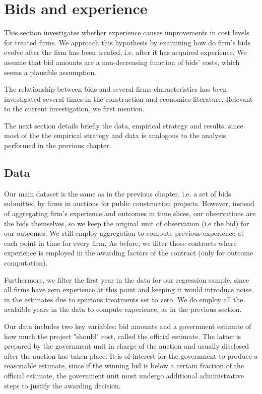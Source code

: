 \section{Bids and experience}
\label{section:bidsexp}
This section investigates whether experience causes improvements in cost levels for treated firms. We approach this hypothesis by examining how do firm's bids evolve after the firm has been treated, i.e. after it has acquired experience. We assume that bid amounts are a non-decreasing function of bids' costs, which seems a plausible assumption.

The relationship between bids and several firms characteristics has been investigated several times in the construction and economics literature. Relevant to the current investigation, we first mention.

The next section details briefly the data, empirical strategy and results, since most of the the empirical strategy and data is analogous to the analysis performed in the previous chapter.

\subsection{Data}
Our main dataset is the same as in the previous chapter, i.e. a set of bids submitted by firms in auctions for public construction projects. However, instead of aggregating firm's experience and outcomes in time slices, our observations are the bids themselves, so we keep the original unit of observation (i.e the bid) for our outcomes. We still employ aggregation to compute previous experience at each point in time for every firm. As before, we filter those contracts where experience is employed in the awarding factors of the contract (only for outcome computation).

Furthermore, we filter the first year in the data for our regression sample, since all firms have zero experience at this point and keeping it would introduce noise in the estimates due to spurious treatments set to zero. We do employ all the avalaible years in the data to compute experience, as in the previous section.

Our data includes two key variables: bid amounts and a government estimate of how much the project "should" cost, called the official estimate. The latter is prepared by the government unit in charge of the auction and usually disclosed after the auction has taken place. It is of interest for the government to produce a reasonable estimate, since if the winning bid is below a certain fraction of the official estimate, the government unit must undergo additional administrative steps to justify the awarding decision.

